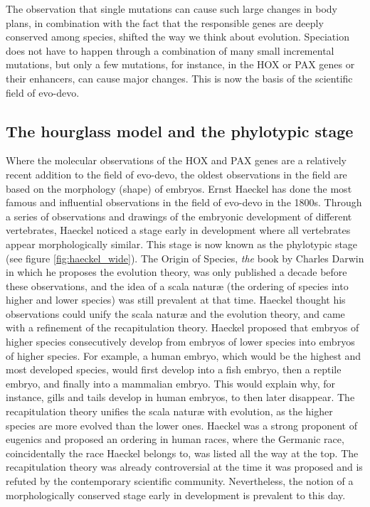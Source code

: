 The observation that single mutations can cause such large changes in body plans, in combination with the fact that the responsible genes are deeply conserved among species, shifted the way we think about evolution. Speciation does not have to happen through a combination of many small incremental mutations, but only a few mutations, for instance, in the HOX or PAX genes or their enhancers, can cause major changes. This is now the basis of the scientific field of evo-devo.

\subsection{The hourglass model and the phylotypic stage}

Where the molecular observations of the HOX and PAX genes are a relatively recent addition to the field of evo-devo, the oldest observations in the field are based on the morphology (shape) of embryos. Ernst Haeckel has done the most famous and influential observations in the field of evo-devo in the 1800s\cite{haeckel1866}. Through a series of observations and drawings of the embryonic development of different vertebrates, Haeckel noticed a stage early in development where all vertebrates appear morphologically similar. This stage is now known as the phylotypic stage (see figure \ref{fig:haeckel_wide}). The Origin of Species, \textit{the} book by Charles Darwin in which he proposes the evolution theory, was only published a decade before these observations, and the idea of a scala naturæ (the ordering of species into higher and lower species) was still prevalent at that time. Haeckel thought his observations could unify the scala naturæ and the evolution theory, and came with a refinement of the recapitulation theory. Haeckel proposed that embryos of higher species consecutively develop from embryos of lower species into embryos of higher species. For example, a human embryo, which would be the highest and most developed species, would first develop into a fish embryo, then a reptile embryo, and finally into a mammalian embryo. This would explain why, for instance, gills and tails develop in human embryos, to then later disappear. The recapitulation theory unifies the scala naturæ with evolution, as the higher species are more evolved than the lower ones. Haeckel was a strong proponent of eugenics and proposed an ordering in human races, where the Germanic race, coincidentally the race Haeckel belongs to, was listed all the way at the top\cite{Levit2020}. The recapitulation theory was already controversial at the time it was proposed and is refuted by the contemporary scientific community. Nevertheless, the notion of a morphologically conserved stage early in development is prevalent to this day.

